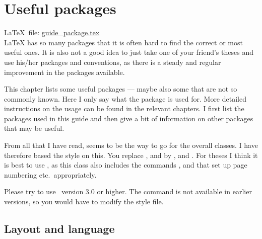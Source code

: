 
\chapter{Useful packages}%
\label{sec:package}

\LaTeX\ file: \href{run:./guide_package.tex}{guide\_package.tex}\\[1ex]
\noindent
\LaTeX{} has so many packages that it is often hard to find the
correct or most useful ones. It is also not a good idea to just take
one of your friend's theses and use his/her packages and conventions,
as there is a steady and regular improvement in the packages
available.

This chapter lists some useful packages --- maybe also some that
are not so commonly known. Here I only say what the package is used
for. More detailed instructions on the usage can be found in the
relevant chapters. I first list the packages used in this guide
and then give a bit of information on other packages that may be useful.

From all that I have read, \KOMAScript{}
seems to be the way to go for the overall classes. I have therefore
based the  style on this. You replace
,  and  by
,  and . For
theses I think it is best to use , as this class also
includes the commands ,  and
 that set up page numbering etc.\ appropriately.

Please try to use \KOMAScript\ version 3.0 or higher. The
 command is not available in earlier versions, so
you would have to modify the style file.


\section{Layout and language}%
\label{sec:package:layout}

